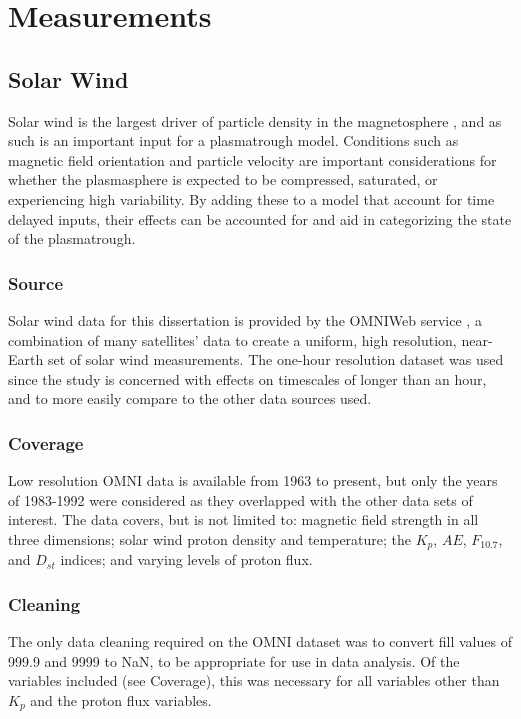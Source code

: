 \chapter[Measurements]{Measurements}

\section{Solar Wind}
Solar wind is the largest driver of particle density in the magnetosphere , and as such is an important input for a plasmatrough model. Conditions such as magnetic field orientation and particle velocity are important considerations for whether the plasmasphere is expected to be compressed, saturated, or experiencing high variability. By adding these to a model that account for time delayed inputs, their effects can be accounted for and aid in categorizing the state of the plasmatrough.

\subsection{Source}
Solar wind data for this dissertation is provided by the OMNIWeb service , a combination of many satellites' data to create a uniform, high resolution, near-Earth set of solar wind measurements. The one-hour resolution dataset was used since the study is concerned with effects on timescales of longer than an hour, and to more easily compare to the other data sources used.

\subsection{Coverage}
Low resolution OMNI data is available from 1963 to present, but only the years of 1983-1992 were considered as they overlapped with the other data sets of interest. The data covers, but is not limited to: magnetic field strength in all three dimensions; solar wind proton density and temperature; the $K_p$, $AE$, $F_{10.7}$, and $D_{st}$ indices; and varying levels of proton flux.

\subsection{Cleaning}
The only data cleaning required on the OMNI dataset was to convert fill values of 999.9 and 9999 to NaN, to be appropriate for use in data analysis. Of the variables included (see Coverage), this was necessary for all variables other than $K_p$ and the proton flux variables.

